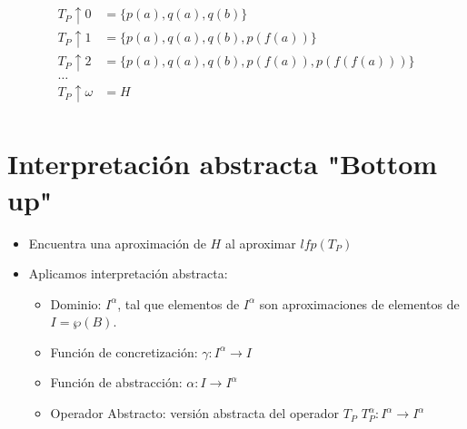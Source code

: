 \documentclass[11pt]{article}
\begin{document}
\begin{align}
T_P \uparrow 0 &= \{ p(a),q(a),q(b) \}\\

T_P \uparrow 1 &= \{ p(a),q(a),q(b),p(f(a)) \} \\

T_P \uparrow 2 &= \{ p(a),q(a),q(b),p(f(a)),p(f(f(a))) \} \\

\ldots \\

T_P \uparrow \omega &= H \\
\end{align}      


\section*{Interpretación abstracta "Bottom up"}
\label{sec:org7a14720}
\begin{itemize}
\item Encuentra una aproximación de \(H\) al aproximar \(lfp(T_P)\)
\item Aplicamos interpretación abstracta:
\begin{itemize}
\item Dominio: \(I^\alpha\), tal que elementos de \(I^\alpha\) son
aproximaciones de elementos de \(I = \wp(B)\).
\item Función de concretización: \(\gamma: I^\alpha \rightarrow I\)
\item Función de abstracción: \(\alpha: I \rightarrow I^\alpha\)
\item Operador Abstracto: versión abstracta del operador \(T_P\)
\(T^\alpha_P : I^\alpha \rightarrow I^\alpha\)
\end{itemize}
\end{itemize}
\end{document}
